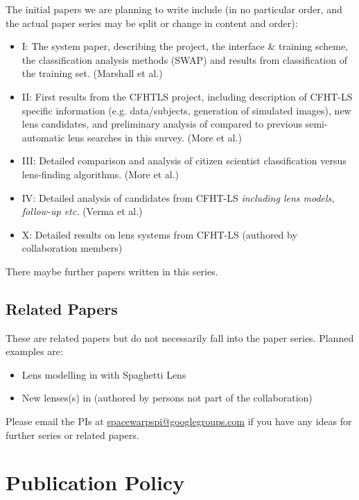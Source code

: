 \documentclass[a4paper]{article}
\begin{document}
The initial papers we are planning to write include (in no particular order,
and the actual paper series may be split or change in content and order):

\begin{itemize}

\item \sw I: The system paper, describing the project, the interface \& training scheme, the classification analysis methods (SWAP) and results from classification of the training set. (Marshall et al.)
\item \sw II: First results from the \sw CFHTLS project, including description of CFHT-LS specific information (e.g. data/subjects, generation of simulated images), new lens candidates, and preliminary analysis of \sw compared to previous semi-automatic lens searches in this survey. (More et al.)
\item \sw III: Detailed comparison and analysis of citizen scientist classification versus lens-finding algorithms. (More et al.)
\item \sw IV: Detailed analysis of candidates from CFHT-LS \textit{including lens models, follow-up etc.} (Verma et al.)
\item \sw X: Detailed results on lens systems from CFHT-LS (authored by \sw collaboration members)
\end{itemize}

There maybe further papers written in this series. \newline

\subsection{\sw Related Papers}
These are \sw related papers but do not necessarily fall into the \sw paper series. Planned examples are:
\begin{itemize}
\item Lens modelling in \sw with {\sc Spaghetti Lens}
\item New lenses(s) in \sw (authored by persons not part of the \sw collaboration)
\end{itemize}


Please email the \sw PIs at \href{mailto:spacewarpspi@googlegroups.com}{spacewarpspi@googlegroups.com} if you have any
ideas for further \sw series or related papers. 
 

\section{Publication Policy}
\label{sec:publ}
\end{document}
